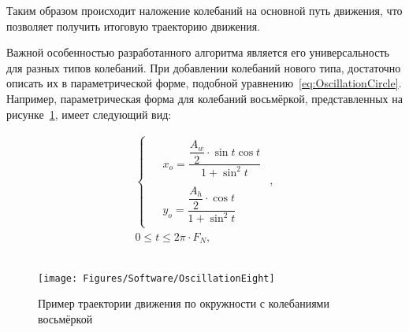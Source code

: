 Таким образом происходит наложение колебаний на основной путь движения, что позволяет получить итоговую траекторию движения.

Важной особенностью разработанного алгоритма является его универсальность для разных типов колебаний.
При добавлении колебаний нового типа, достаточно описать их в параметрической форме, подобной уравнению~\ref{eq:OscillationCircle}.
Например, параметрическая форма для колебаний восьмёркой, представленных на рисунке~\ref{fig:OscillationEight}, имеет следующий вид:

\begin{gather*}
    \begin{cases}
        \begin{aligned}
            &x_o = \dfrac{\dfrac{A_w}{2} \cdot \sin t \cos t}{1 + \sin^2 t} \\
            \\
            &y_o = \dfrac{\dfrac{A_h}{2} \cdot \cos t}{1 + \sin^2 t}
        \end{aligned}
    \end{cases}, \\
    0 \leq t \leq 2 \pi \cdot F_N,
\end{gather*} \\

\begin{figure}[H]
    \centering
    \vspace{14pt}
    \texttt{[image: Figures/Software/OscillationEight]}
    \caption{Пример траектории движения по окружности с колебаниями восьмёркой}
    \label{fig:OscillationEight}
\end{figure}